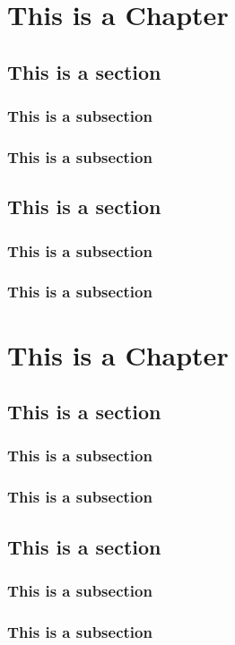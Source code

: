 \documentclass[11pt,oneside]{book}
\begin{document}
\begin{appendices}
\chapter{This is a Chapter}
\section{This is a section}
\subsection{This is a subsection}
\lipsum[1-3]

\subsection{This is a subsection}
\lipsum[1-2]

\section{This is a section}
\subsection{This is a subsection}
\lipsum[1-1]
\subsection{This is a subsection}
\lipsum[1-2]

\chapter{This is a Chapter}
\section{This is a section}
\subsection{This is a subsection}
\lipsum[1-3]

\subsection{This is a subsection}
\lipsum[1-2]

\section{This is a section}
\subsection{This is a subsection}
\lipsum[1-1]
\subsection{This is a subsection}
\lipsum[1-2]


\end{appendices}
\end{document}
